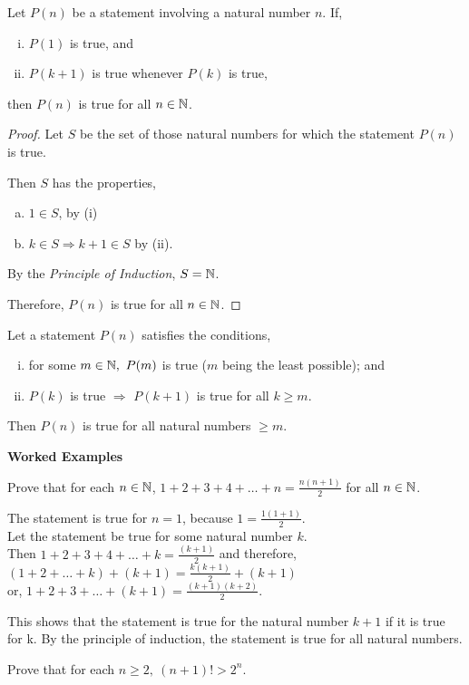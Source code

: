 \documentclass[11pt]{scrartcl}
\begin{document}
	\begin{theorem}
		Let $P(n)$ be a statement involving a natural number $n$. If,
		\begin{enumerate}[i)]
			\item $P(1)$ is true, and
			\item $P(k+1)$ is true whenever $P(k)$ is true,
		\end{enumerate}
		then $P(n)$ is true for all $n \in \mathbb N$.
	\end{theorem}

	\begin{proof}
		Let $S$ be the set of those natural numbers for which the statement $P(n)$ is true.
		
		Then $S$ has the properties,
		\begin{enumerate}[(a)]
			\item $1 \in S$, by (i)
			\item $k \in S \Rightarrow k+1 \in S$ by (ii).
		\end{enumerate}
	
		By the \emph{Principle of Induction}, $S = \mathbb N$.
		
		Therefore, $P(n)$ is true for all $n \in \mathbb N$.
	\end{proof}

	\begin{remark}
		Let a statement $P(n)$ satisfies the conditions,
		\begin{enumerate}[(i)]
			\item for some $m \in \mathbb N,\ P(m)$ is true ($m$ being the least possible); and
			\item $P(k)$ is true $\Rightarrow$ $P(k+1)$ is true for all $k \geq m$.
		\end{enumerate}
		Then $P(n)$ is true for all natural numbers $\geq m$.
	\end{remark}

	\pagebreak

	\begin{flushleft}
			\textbf{Worked Examples}
	\end{flushleft}
	\begin{example}
		Prove that for each $n \in \mathbb N$, $1+2+3+4+\dots +n = \frac{n(n+1)}{2}$ for all $n \in \mathbb N$.
	\end{example}

	The statement is true for $n=1$, because $1 = \frac{1(1+1)}{2}$.\\
	Let the statement be true for some natural number $k$.\\
	Then $1+2+3+4+\dots +k = \frac{(k+1)}{2}$ and therefore,\\
	$(1+2+\dots+k)+(k+1) = \frac{k(k+1)}{2} + (k+1)$\\
	or, $1 +2 +3 + \dots +(k+1) = \frac{(k+1)(k+2)}{2}$.
	
	This shows that the statement is true for the natural number $k+1$ if it is true for k. By the principle of induction, the statement is true for all natural numbers.
	
	\begin{example}
		Prove that for each $n \geq 2,\ (n+1)! > 2^{n}$.
	\end{example}

	
\end{document}
